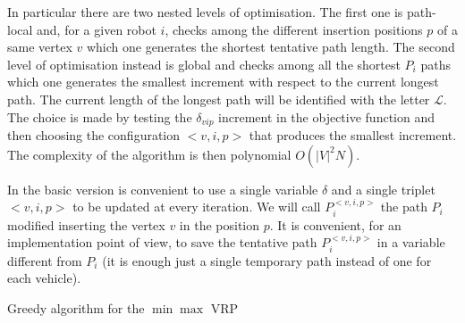 In particular there are two nested levels of optimisation.
The first one is path-local and, for a given robot $i$, checks among the different insertion positions $p$ of a same vertex $v$ which one generates the shortest tentative path length.
The second level of optimisation instead is global and checks among all the shortest $P_i$ paths which one generates the smallest increment with respect to the current longest path. The current length of the longest path will be identified with the letter $\mathcal{L}$.
The choice is made by testing the $\delta_{vip}$ increment in the objective function and then choosing the configuration $<v,i,p>$ that produces the smallest increment.
The complexity of the algorithm is then polynomial $O(\vert V \vert^2 N)$.

In the basic version is convenient to use a single variable $\delta$ and a single triplet \mbox{$<v,i,p>$} to be updated at every iteration. We will call $P_i^{<v,i,p>}$ the path $P_i$ modified inserting the vertex $v$ in the position $p$.
It is convenient, for an implementation point of view, to save the tentative path $P_i^{<v,i,p>}$ in a variable different from $P_i$ (it is enough just a single temporary path instead of one for each vehicle).

\begin{algorithm}[ht]
\begin{algorithmic}[1]
 \label{a:initU}
 \label{a:initFor_i}
\label{a:initP_i}
\ENDFOR \label{a:endForiniti}
\label{a:bigWhile}
\label{a:initDelta}
\label{a:initBigL}
\label{a:initChoice}
 \label{a:forV}
  \label{a:forI}
  \label{a:initLength}
   \label{a:forPos}
   \label{a:updateLtent}
    \label{a:checkLtent}
    \label{a:updateLmin}
    \label{a:calcDelta}
    \label{a:testDelta}
     \label{a:saveDelta}
     \label{a:saveChoice}
    \ENDIF \label{a:endIfTestDelta}
    \ENDIF
   \ENDFOR \label{a:endForPos}
  \ENDFOR \label{a:endForI}
 \ENDFOR \label{a:endForV}
  \label{a:doIt}
   \label{a:removeV}
\ENDWHILE \label{a:endBigWhile} 
 \label{a:return}
\end{algorithmic}
\caption{Greedy algorithm for the $\min \max$ VRP}\label{alg:greedy}
\end{algorithm}

